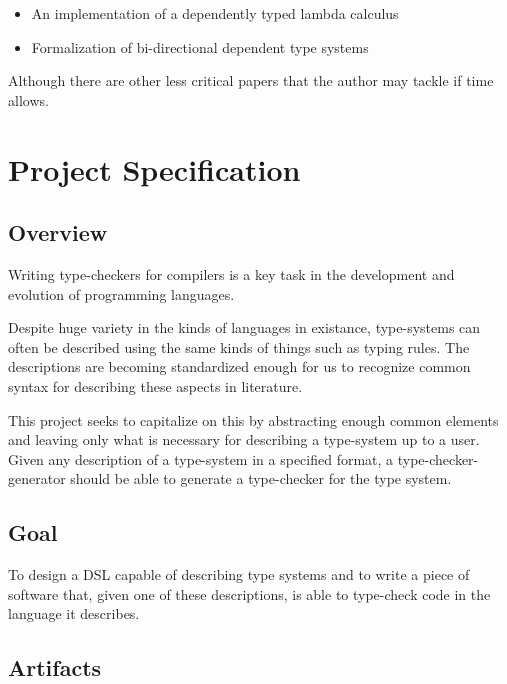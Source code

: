 \documentclass{ProgressReport}[2020/09/15]
\begin{document}
          \begin{itemize}
          \item An implementation of a dependently typed lambda
            calculus \cite{ATutorialImplementationOfDTLC}
          \item Formalization of bi-directional dependent type systems \cite{TypesWhoSayNi}
          \end{itemize}

          Although there are other less critical papers that the
          author may tackle if time allows.
       
        \chapter{Project Specification}

          \section{Overview}

          Writing type-checkers for compilers is a key task in the
          development and evolution of programming languages.

          Despite huge variety in the kinds of languages in existance,
          type-systems can often be described using the same kinds of
          things such as typing rules. The descriptions are becoming
          standardized enough for us to recognize common syntax for
          describing these aspects in literature.

          This project seeks to capitalize on this by abstracting
          enough common elements and leaving only what is necessary
          for describing a type-system up to a user. Given any
          description of a type-system in a specified format, a
          type-checker-generator should be able to generate a
          type-checker for the type system.
          
          \section{Goal}

          To design a DSL capable of describing type systems and to
          write a piece of software that, given one of these
          descriptions, is able to type-check code in the language
          it describes.

          \section{Artifacts}
\end{document}
